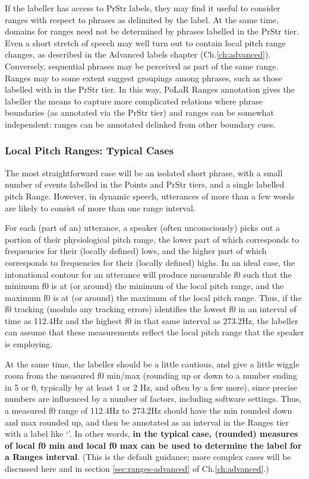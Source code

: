 If the labeller has access to PrStr labels, they may find it useful to consider ranges with respect to phrases as delimited by the \textlabel{]} label. At the same time, domains for ranges need not be determined by phrases labelled in the PrStr tier. Even a short stretch of speech may well turn out to contain local pitch range changes, as described in the Advanced labels chapter (Ch.\ref{ch:advanced}). Conversely, sequential phrases may be perceived as part of the same range. Ranges may to some extent suggest groupings among phrases, such as those labelled with \textlabel{]} in the PrStr tier. In this way, PoLaR Ranges annotation gives the labeller the means to capture more complicated relations where phrase boundaries (as annotated via the PrStr tier) and ranges can be somewhat independent: ranges can be annotated delinked from other boundary cues.

\subsubsection{Local Pitch Ranges: Typical Cases}\label{sec:local-pitch-ranges-typical-cases}

The most straightforward case will be an isolated short phrase, with a small number of events labelled in the Points and PrStr tiers, and a single labelled pitch Range. However, in dynamic speech, utterances of more than a few words are likely to consist of more than one range interval.

For each (part of an) utterance, a speaker (often unconsciously) picks out a portion of their physiological pitch range, the lower part of which corresponds to frequencies for their (locally defined) lows, and the higher part of which corresponds to frequencies for their (locally defined) highs. In an ideal case, the intonational contour for an utterance will produce measurable f0 such that the minimum f0 is at (or around) the minimum of the local pitch range, and the maximum f0 is at (or around) the maximum of the local pitch range. Thus, if the f0 tracking (modulo any tracking errors) identifies the lowest f0 in an interval of time as 112.4Hz and the highest f0 in that same interval as 273.2Hz, the labeller can assume that these measurements reflect the local pitch range that the speaker is employing.

At the same time, the labeller should be a little cautious, and give a little wiggle room from the measured f0 min\slash max (rounding up or down to a number ending in 5 or 0, typically by at least 1 or 2 Hz, and often by a few more), since precise numbers are influenced by a number of factors, including software settings. Thus, a measured f0 range of 112.4Hz to 273.2Hz should have the min rounded down and max rounded up, and then be annotated as an interval in the Ranges tier with a label like ‘’. In other words, \textbf{in the typical case, (rounded) measures of local f0 min and local f0 max can be used to determine the label for a Ranges interval}. (This is the default guidance; more complex cases will be discussed here and in section \ref{sec:ranges-advanced} of Ch.\ref{ch:advanced}.)


